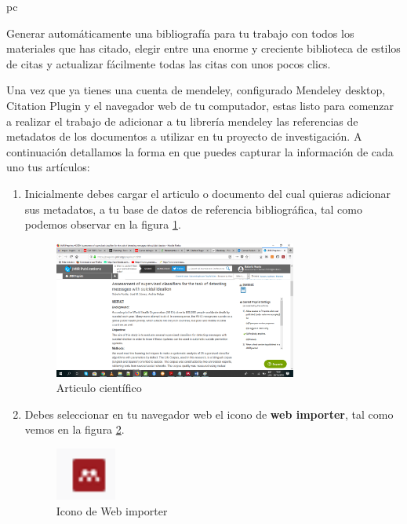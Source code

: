pc\documentclass[a4paper,12pt,openany]{book}
\begin{document}
\begin{itemize}
\begin{itemize}
Generar automáticamente una bibliografía para tu trabajo con todos los materiales que has citado, elegir entre una enorme y creciente biblioteca de estilos de citas y actualizar fácilmente todas las citas con unos pocos clics.

\end{itemize}

Una vez que ya tienes una cuenta de mendeley, configurado Mendeley desktop, Citation Plugin y el navegador web de tu computador, estas listo para comenzar a realizar el trabajo de adicionar a tu librería mendeley las referencias de metadatos de los documentos a utilizar en tu proyecto de investigación. A continuación detallamos la forma en que puedes capturar la información de cada uno tus artículos:

\begin{enumerate}
    \item Inicialmente debes cargar el articulo o documento del cual quieras adicionar sus metadatos, a tu  base de datos de referencia bibliográfica, tal como podemos observar en la figura  \ref{fig:mendeley14}.
    
    \begin{figure}[H]
    \centering
	\includegraphics[width=8cm]{mendeley14.png}
    \caption{Articulo científico}
    \label{fig:mendeley14}
    \end{figure}
    
    \item Debes seleccionar en tu navegador web el icono de \textbf{web importer}, tal como vemos en la figura \ref{fig:mendeley15}.  
    
    \begin{figure}[H]
    \centering
	\includegraphics[width=2cm]{mendeley12.png}
    \caption{Icono de Web importer}
    \label{fig:mendeley15}
    \end{figure}


\end{enumerate}
\end{itemize}
\end{document}
